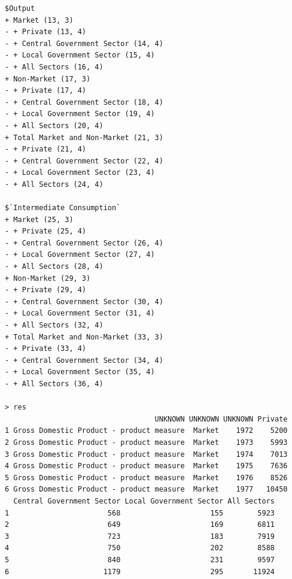 \documentclass[a4paper]{article}
\begin{document}
\begin{verbatim}
$Output
+ Market (13, 3)
- + Private (13, 4)
- + Central Government Sector (14, 4)
- + Local Government Sector (15, 4)
- + All Sectors (16, 4)
+ Non-Market (17, 3)
- + Private (17, 4)
- + Central Government Sector (18, 4)
- + Local Government Sector (19, 4)
- + All Sectors (20, 4)
+ Total Market and Non-Market (21, 3)
- + Private (21, 4)
- + Central Government Sector (22, 4)
- + Local Government Sector (23, 4)
- + All Sectors (24, 4)

$`Intermediate Consumption`
+ Market (25, 3)
- + Private (25, 4)
- + Central Government Sector (26, 4)
- + Local Government Sector (27, 4)
- + All Sectors (28, 4)
+ Non-Market (29, 3)
- + Private (29, 4)
- + Central Government Sector (30, 4)
- + Local Government Sector (31, 4)
- + All Sectors (32, 4)
+ Total Market and Non-Market (33, 3)
- + Private (33, 4)
- + Central Government Sector (34, 4)
- + Local Government Sector (35, 4)
- + All Sectors (36, 4)

> res 
                                   UNKNOWN UNKNOWN UNKNOWN Private
1 Gross Domestic Product - product measure  Market    1972    5200
2 Gross Domestic Product - product measure  Market    1973    5993
3 Gross Domestic Product - product measure  Market    1974    7013
4 Gross Domestic Product - product measure  Market    1975    7636
5 Gross Domestic Product - product measure  Market    1976    8526
6 Gross Domestic Product - product measure  Market    1977   10450
  Central Government Sector Local Government Sector All Sectors
1                       568                     155        5923
2                       649                     169        6811
3                       723                     183        7919
4                       750                     202        8588
5                       840                     231        9597
6                      1179                     295       11924
\end{verbatim}

\newpage
\end{document}
